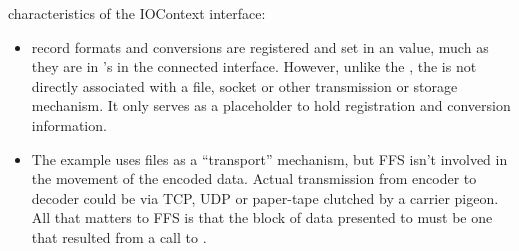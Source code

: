 characteristics of the IOContext interface:
\begin{itemize}
\item record formats and conversions are registered and set in an  value, much as they are in 's in the connected
interface.  However, unlike the , the  is not
directly associated with a file, socket or other transmission or storage
mechanism.  It only serves as a placeholder to hold registration and
conversion information.
\item The example uses files as a ``transport'' mechanism, but FFS isn't
involved in the movement of the encoded data.  Actual transmission from
encoder to decoder could be via TCP, UDP or paper-tape clutched by a carrier
pigeon.  All that matters to FFS is that the block of data presented to
 must be one that resulted from a call to
.
\end{itemize}

